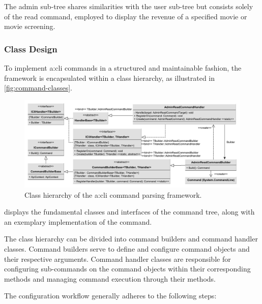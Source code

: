 The admin sub-tree shares similarities with the user sub-tree but consists solely of the read command, employed to display the revenue of a specified movie or movie screening.

\subsubsection{Class Design}

To implement \gls{a:cli} commands in a structured and maintainable fashion, the  framework is encapsulated within a class hierarchy, as illustrated in \vref{fig:command-classes}.

\begin{figure}[H]
    \centering
    \includegraphics[width=\textwidth]{images/client-cli-command-parsing.pdf}
    \caption{Class hierarchy of the \gls{a:cli} command parsing framework.}
    \label{fig:command-classes}
\end{figure}

 displays the fundamental classes and interfaces of the command tree, along with an exemplary implementation of the  command.

The class hierarchy can be divided into command builders and command handler classes. Command builders serve to define and configure  command objects and their respective arguments. Command handler classes are responsible for configuring sub-commands on the  command objects within their corresponding  methods and managing command execution through their  methods.

The configuration workflow generally adheres to the following steps:

